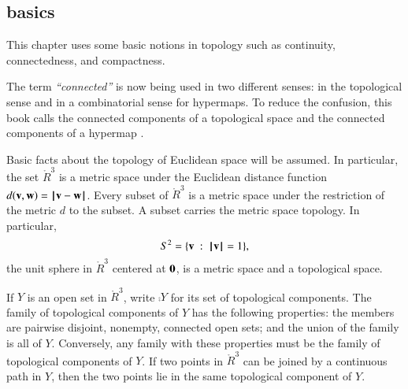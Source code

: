 \subsection{basics}

This chapter uses some basic
notions in topology such as continuity, connectedness, and compactness.

\begin{remark} The term {\it ``connected''} is now being used in two
different senses: in the topological sense and in a combinatorial
sense for hypermaps.  To reduce the confusion, this book calls the
connected components of a topological space  and the connected components of a hypermap
.
\end{remark}
%
%
%


Basic facts about the topology of Euclidean space will be assumed.  In
particular, the set $\ring{R}^3$ is a metric space under the Euclidean
distance function $d({\mathbf v},{\mathbf w}) = {\hskip0.1em|\hskip-0.15em|\hskip0.1em}{\mathbf v} - {\mathbf w}{\hskip0.1em|\hskip-0.15em|\hskip0.1em}$.  Every subset of
$\ring{R}^3$ is a metric space under the restriction of the metric $d$
to the subset.  A subset carries the metric space topology.  In
particular, \begin{displaymath}S^2 = \{ {\mathbf v} \ :\  {{\hskip0.1em|\hskip-0.15em|\hskip0.1em} {\mathbf v}{\hskip0.1em|\hskip-0.15em|\hskip0.1em}} =
1\},\end{displaymath} the unit sphere in $\ring{R}^3$ centered at
${\mathbf 0}$, is a metric space and a topological space.

If $Y$ is an open set in $\ring{R}^3$, write
$\comp{Y}$ for its set of topological components.
%
The family of topological components of $Y$ has the following properties:
the members are pairwise disjoint, nonempty, connected open sets; and the
union of the family is all of $Y$.
Conversely, any family with these properties must be the
family of topological components of $Y$.
If two
points in $\ring{R}^3$ 
can be joined by a continuous path in $Y$,
then the two points lie in the same topological component of $Y$.
%
%
%







